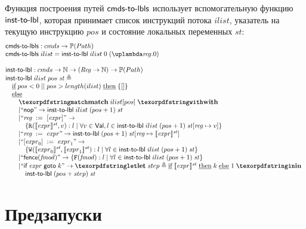 Функция построения путей $\textup{\sf cmds-to-lbls}$ использует вспомогательную функцию $\textup{\sf inst-to-lbl}$,
которая принимает список инструкций потока $ilist$, указатель на текущую инструкцию $pos$ и
состояние локальных переменных $st$:
\[
\inarr{
  \cmdsToLbls : \Carm \rightarrow \Pset(\Path) \\
  \cmdsToLbls \; ilist = \instToLbl \; ilist \; 0 \; (\lambda \reg. 0) \\
  \\
  \instToLbl : \Carm \rightarrow \mathbb{N} \rightarrow (\Reg \rightarrow \mathbb{N}) \rightarrow \Pset(\Path) \\
  \instToLbl \; ilist \; pos \; \PromState \defeq \\
  \quad \textIf   pos < 0 \; || \; pos > length(ilist) \; \textThen \{ [] \} \\
  \quad \textElse \\
  \qquad \kw{match} \; ilist[pos] \; \kw{with} \\
  \qquad
    \begin{array}{@{}l}
    | ``\nop" \rightarrow \instToLbl \; ilist \; (pos + 1) \; \PromState \\
    | ``\readInst{\reg}{\expr}" \rightarrow \\
      \quad \{ \rlab{}{\semState{\expr}{\PromState}}{\val} : l \mid
      \forall \val \in \Val, l \in \instToLbl \; ilist \; (pos + 1) \; \PromState[\reg \mapsto \val] \} \\
    | ``\assignInst{\reg}{\expr}" \rightarrow
                 \instToLbl \; (pos + 1) \; \PromState[\reg \mapsto \semState{\expr}{\PromState}] \\
    | ``\writeInst{\expr_0}{\expr_1}" \rightarrow \\
      \quad \{ \wlab{}{\semState{\expr_0}{\PromState}}{\semState{\expr_1}{\PromState}} : l \mid
      \forall l \in \instToLbl \; ilist \; (pos + 1) \; \PromState \} \\
    | ``\fenceInst{\FtypeProm}" \rightarrow
      \{ \flab{\FtypeProm} : l \mid \forall l \in \instToLbl \; ilist \; (pos + 1) \; \PromState \} \\
    | ``\ifGotoInst{\expr}{k}" \rightarrow
      \letdef{step}{\textIf \semState{\expr}{\PromState} \; \textThen k \; \textElse 1} \\
      \quad \instToLbl \; (pos + step) \; \PromState \\
  \end{array} \\
}
\]

\section{Предзапуски}
\label{app:comptopreexec}

